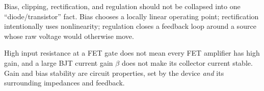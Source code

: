 \begin{exambox}
Bias, clipping, rectification, and regulation should not be collapsed into one
``diode/transistor'' fact.  Bias chooses a locally linear operating point;
rectification intentionally uses nonlinearity; regulation closes a feedback loop
around a source whose raw voltage would otherwise move.
\end{exambox}

\begin{mistakebox}
High input resistance at a FET gate does not mean every FET amplifier has high
gain, and a large BJT current gain \(\beta\) does not make its collector current
stable.  Gain and bias stability are circuit properties, set by the device \emph{and}
its surrounding impedances and feedback.
\end{mistakebox}

